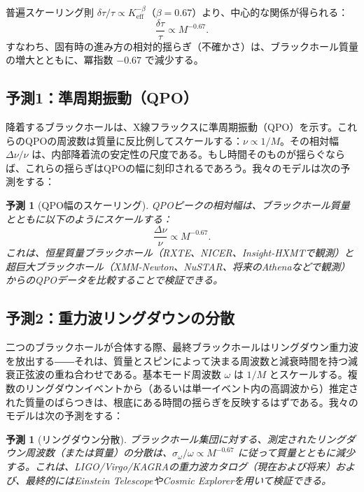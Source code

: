 \documentclass[12pt,a4paper]{article}
\newtheorem{prediction}[theorem]{予測}
\newcommand{\Keff}{K_{\mathrm{eff}}}
\begin{document}
	普遍スケーリング則 \(\delta \tau / \tau \propto \Keff^{-\beta}\)（\(\beta = 0.67\)）より、中心的な関係が得られる：
	\begin{equation}
		\boxed{\frac{\delta \tau}{\tau} \propto M^{-0.67}}.
	\end{equation}
	すなわち、固有時の進み方の相対的揺らぎ（不確かさ）は、ブラックホール質量の増大とともに、冪指数 \(-0.67\) で減少する。
	
	\subsection{予測1：準周期振動（QPO）}
	
	降着するブラックホールは、X線フラックスに準周期振動（QPO）を示す。これらのQPOの周波数は質量に反比例してスケールする：\(\nu \propto 1/M\)。その相対幅 \(\Delta\nu/\nu\) は、内部降着流の安定性の尺度である。もし時間そのものが揺らぐならば、これらの揺らぎはQPOの幅に刻印されるであろう。我々のモデルは次の予測をする：
	\begin{prediction}[QPO幅のスケーリング]
		QPOピークの相対幅は、ブラックホール質量とともに以下のようにスケールする：
		\begin{equation}
			\frac{\Delta\nu}{\nu} \propto M^{-0.67}.
		\end{equation}
		これは、恒星質量ブラックホール（RXTE、NICER、Insight-HXMTで観測）と超巨大ブラックホール（XMM-Newton、NuSTAR、将来のAthenaなどで観測）からのQPOデータを比較することで検証できる。
	\end{prediction}
	
	\subsection{予測2：重力波リングダウンの分散}
	
	二つのブラックホールが合体する際、最終ブラックホールはリングダウン重力波を放出する――それは、質量とスピンによって決まる周波数と減衰時間を持つ減衰正弦波の重ね合わせである。基本モード周波数 \(\omega\) は \(1/M\) とスケールする。複数のリングダウンイベントから（あるいは単一イベント内の高調波から）推定された質量のばらつきは、根底にある時間の揺らぎを反映するはずである。我々のモデルは次の予測をする：
	\begin{prediction}[リングダウン分散]
		ブラックホール集団に対する、測定されたリングダウン周波数（または質量）の分散は、\(\sigma_{\omega}/\omega \propto M^{-0.67}\) に従って質量とともに減少する。これは、LIGO/Virgo/KAGRAの重力波カタログ（現在および将来）および、最終的にはEinstein TelescopeやCosmic Explorerを用いて検証できる。
	\end{prediction}
	
\end{document}

